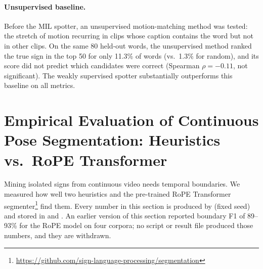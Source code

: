 \paragraph{Unsupervised baseline.} Before the MIL spotter, an unsupervised motion-matching method was tested: the stretch of motion recurring in clips whose caption contains the word but not in other clips. On the same 80 held-out words, the unsupervised method ranked the true sign in the top 50 for only 11.3\% of words (vs.\ 1.3\% for random), and its score did not predict which candidates were correct (Spearman $\rho{=}-0.11$, not significant). The weakly supervised spotter substantially outperforms this baseline on all metrics.

\section{Empirical Evaluation of Continuous Pose Segmentation: Heuristics vs.\ RoPE Transformer}
\label{sec:results_segmentation}

\begin{sloppypar}
Mining isolated signs from continuous video needs temporal boundaries. We measured how well two heuristics and the
pre-trained RoPE Transformer segmenter\footnote{\url{https://github.com/sign-language-processing/segmentation}} find them. Every number in this section is produced
by  (fixed seed) and stored in 
and . An earlier version of this section reported boundary F1 of
89--93\% for the RoPE model on four corpora; no script or result file produced those numbers, and they are withdrawn.
\end{sloppypar}

